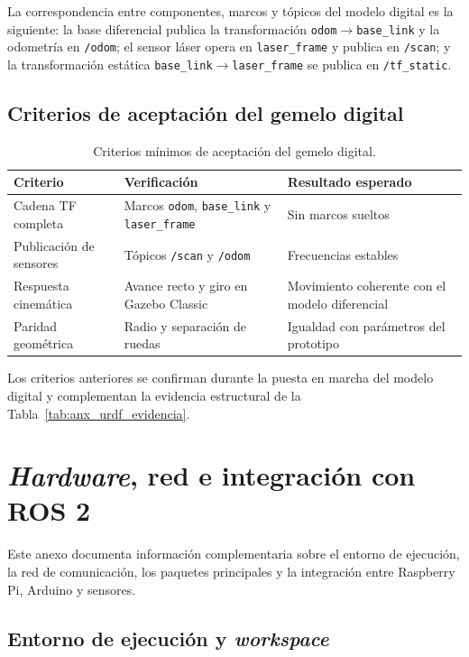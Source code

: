 \begin{appendices}
La correspondencia entre componentes, marcos y tópicos del modelo digital es la
siguiente: la base diferencial publica la transformación
\texttt{odom}$\rightarrow$\texttt{base\_link} y la odometría en \texttt{/odom};
el sensor láser opera en \texttt{laser\_frame} y publica en \texttt{/scan}; y la
transformación estática \texttt{base\_link}$\rightarrow$\texttt{laser\_frame} se
publica en \texttt{/tf\_static}.

\subsection{Criterios de aceptación del gemelo digital}

\begin{table}[H]
\centering
\caption{Criterios mínimos de aceptación del gemelo digital.}
\label{tab:criterios_aceptacion_resumen}
\small
\begin{tabular}{p{4.3cm} p{4.8cm} p{4.5cm}}
\toprule
\textbf{Criterio} & \textbf{Verificación} & \textbf{Resultado esperado} \\
\midrule
Cadena TF completa & Marcos \texttt{odom}, \texttt{base\_link} y \texttt{laser\_frame} & Sin marcos sueltos \\
Publicación de sensores & Tópicos \texttt{/scan} y \texttt{/odom} & Frecuencias estables \\
Respuesta cinemática & Avance recto y giro en Gazebo Classic & Movimiento coherente con el modelo diferencial \\
Paridad geométrica & Radio y separación de ruedas & Igualdad con parámetros del prototipo \\
\bottomrule
\end{tabular}
\end{table}

Los criterios anteriores se confirman durante la puesta en marcha del modelo
digital y complementan la evidencia estructural de la
Tabla~\ref{tab:anx_urdf_evidencia}.

\section{\texorpdfstring{\textit{Hardware}}{Hardware}, red e integración con ROS 2}
\label{anx:hardware_ros2}

Este anexo documenta información complementaria sobre el entorno de ejecución, la red de comunicación, los paquetes principales y la integración entre Raspberry Pi, \gls{Arduino} y sensores.

\subsection{Entorno de ejecución y \texorpdfstring{\textit{workspace}}{workspace}}
\label{anx:workspace}


\end{appendices}
